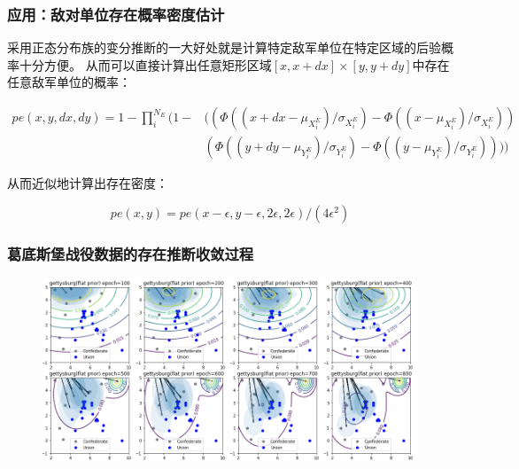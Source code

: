 \documentclass{beamer}
\begin{document}
\begin{frame}
\frametitle{应用：敌对单位存在概率密度估计}

采用正态分布族的变分推断的一大好处就是计算特定敌军单位在特定区域的后验概率十分方便。
从而可以直接计算出任意矩形区域$[x,x+dx]\times[y,y+dy]$中存在任意敌军单位的概率：

\begin{align*}
pe(x,y,dx,dy) = 1-
\prod_i^{N_E}
(1-
& ((\Phi((x + dx - \mu_{X^E_i})/\sigma_{X^E_i}) - \Phi((x - \mu_{X^E_i})/\sigma_{X^E_i})) \\
&  (\Phi((y + dy - \mu_{Y^E_i})/\sigma_{Y^E_i}) - \Phi((y - \mu_{Y^E_i})/\sigma_{Y^E_i})))
)
\end{align*}


从而近似地计算出存在密度：

$$
pe(x,y) = pe(x-\epsilon,y-\epsilon,2\epsilon,2\epsilon)/(4 \epsilon^2)
$$

\end{frame}

\begin{frame}
\frametitle{葛底斯堡战役数据的存在推断收敛过程}

\begin{figure}[htb]
\includegraphics[width=0.99\linewidth]{gettysburg-init-beamer.png}
\label{fig:gettysburgInit}
\end{figure}


\end{frame}
\end{document}

